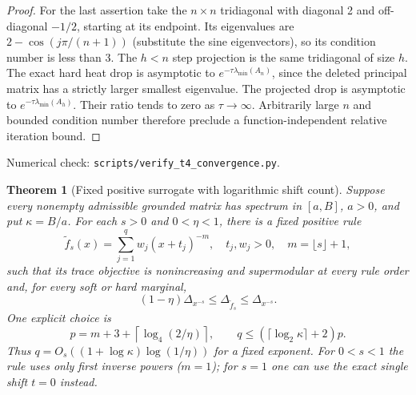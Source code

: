 \documentclass[11pt]{article}
\newtheorem{theorem}{Theorem}
\begin{document}
\begin{proof}
For the last assertion take the $n\times n$ tridiagonal with diagonal
2 and off-diagonal $-1/2$, starting at its endpoint. Its eigenvalues
are $2-\cos(j\pi/(n+1))$ (substitute the sine eigenvectors), so its
condition number is less than 3. The $h<n$ step projection is the
same tridiagonal of size $h$. The exact hard heat drop is asymptotic
to $e^{-\tau\lambda_{\min}(A_n)}$, since the deleted principal
matrix has a strictly larger smallest eigenvalue. The projected drop
is asymptotic to $e^{-\tau\lambda_{\min}(A_h)}$.
Their ratio tends to zero as $\tau\to\infty$. Arbitrarily large $n$
and bounded condition number therefore preclude a function-independent
relative iteration bound.
\end{proof}
\noindent Numerical check: \texttt{scripts/verify\_t4\_convergence.py}.

\begin{theorem}[Fixed positive surrogate with logarithmic shift count]\label{thm:fixedquad}
Suppose every nonempty admissible grounded matrix has spectrum in
$[a,B]$, $a>0$, and put $\kappa=B/a$. For each $s>0$ and
$0<\eta<1$, there is a fixed positive rule
\[
 \widetilde f_s(x)=\sum_{j=1}^q w_j(x+t_j)^{-m},\quad
 t_j,w_j>0,\quad m=\lfloor s\rfloor+1,
\]
such that its trace objective is nonincreasing and supermodular at
every rule order and, for every soft or hard marginal,
\begin{equation}\label{eq:fixedrelative}
 (1-\eta)\Delta_{x^{-s}}\leq\Delta_{\widetilde f_s}\leq\Delta_{x^{-s}}.
\end{equation}
One explicit choice is
\[
 p=m+3+\left\lceil\log_4(2/\eta)\right\rceil,\qquad
 q\leq(\lceil\log_2\kappa\rceil+2)p.
\]
Thus $q=O_s((1+\log\kappa)\log(1/\eta))$ for a fixed exponent.
For $0<s<1$ the rule uses only first inverse powers ($m=1$);
for $s=1$ one can use the exact single shift $t=0$ instead.
\end{theorem}
\end{document}
